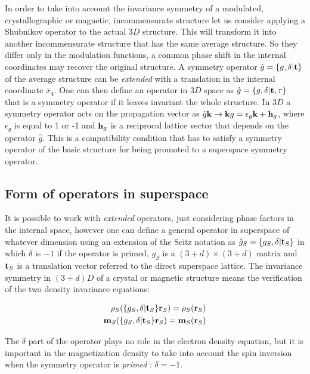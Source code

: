 \documentclass[10pt]{article}
\begin{document}
In order to take into account the invariance symmetry of a modulated, crystallographic or magnetic, incommensurate structure let us consider applying a Shubnikov operator to the actual $3D$ structure. This will transform it into another incommensurate structure that has the same average structure. So they differ only in the modulation functions, a common phase shift in the internal coordinates may recover the original structure. A symmetry operator $\hat g =\{g,\delta|{\bf t}\}$ of the average structure can be {\it extended} with a translation in the internal coordinate $\bar{x}_4$. One can then define an operator in $3D$ space as  $\hat g =\{g,\delta|{\bf t},\tau \}$ that is a symmetry operator if it leaves invariant the whole structure. In $3D$ a symmetry operator acts on the propagation vector as $ \hat g {\bf k} \to {\bf k}g = \epsilon_g {\bf k} + {\bf h}_g $, where $\epsilon_g$ is equal to 1 or -1 and ${\bf h}_g$ is a reciprocal lattice vector that depends on the operator $\hat g$. This is a compatibility condition that has to satisfy a symmetry operator of the basic structure for being promoted to a superspace symmetry operator.   

\subsection{Form of operators in superspace}
\label{oper_super}
It is possible to work with {\it extended} operators, just considering phase factors in the internal space, however one can define a general operator in superspace of whatever dimension using an extension of the Seitz notation as $\hat g_S =\{g_S,\delta|{\bf t}_S \}$ in which $\delta$ is $-1$ if the operator is primed, $g_S$ is a $(3+d)\times(3+d)$ matrix and ${\bf t}_S$ is a translation vector referred to the direct superspace lattice. The invariance symmetry in $(3+d)D$ of a crystal or magnetic structure means the verification of the two density invariance equations:

\begin{eqnarray} \label{super_density}
{\rho}_{S}(\{g_S,\delta|{\bf t}_S\}{\bf r}_S) = {\rho}_{S}({\bf r}_S) \\
{\bf m}_{S}(\{g_S,\delta|{\bf t}_S\}{\bf r}_S) = {\bf m}_{S}({\bf r}_S)
\end{eqnarray}

The $\delta$ part of the operator plays no role in the electron density equation, but it is important in the magnetization density to take into account the spin inversion when the symmetry operator is {\it primed} : $\delta = -1$.
\end{document}
